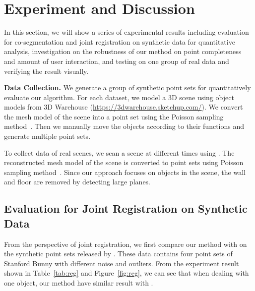 \section{Experiment and Discussion}
\label{sec:results}
In this section, we will show a series of experimental results including evaluation for co-segmentation and joint registration on synthetic data for quantitative analysis, investigation on the robustness of our method on point completeness and amount of user interaction, and testing on one group of real data and verifying the result visually.

\noindent \textbf{Data Collection.} 
We generate a group of synthetic point sets for quantitatively evaluate our algorithm. 
%
For each dataset, we model a 3D scene using object models from 3D Warehouse (\url{https://3dwarehouse.sketchup.com/}).
We convert the mesh model of the scene into a point set using the Poisson sampling method~\cite{PossionSampling}.
%
Then we manually move the objects according to their functions and generate multiple point sets. 

To collect data of real scenes, we scan a scene at different times using \cite{VXH}.
%
The reconstructed mesh model of the scene is converted to point sets using Poisson sampling method~\cite{PossionSampling}.
% 
Since our approach focuses on objects in the scene, the wall and floor are removed by detecting large planes.


\subsection{Evaluation for Joint Registration on Synthetic Data}
From the perspective of joint registration, we first compare our method with \cite{Evangelidis2014} on the synthetic point sets released by \cite{Evangelidis2014}. These data contains four point sets of Stanford Bunny with different noise and outliers. From the experiment result shown in Table~\ref{tab:reg} and Figure~\ref{fig:reg}, we can see that when dealing with one object, our method have similar result with \cite{Evangelidis2014}.

